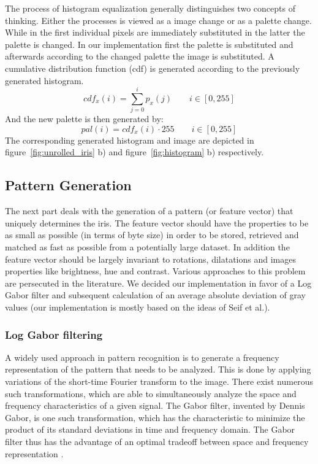 \documentclass[journal]{IEEEtran}
\begin{document}
The process of histogram equalization generally distinguishes two concepts of thinking. Either the processes is viewed as a image change or as a palette change. While in the first individual pixels are immediately substituted in the latter the palette is changed. In our implementation first the palette is substituted and afterwards according to the changed palette the image is substituted.
A cumulative distribution function (cdf) is generated according to the previously generated histogram.
\[
	cdf_x(i) = \sum \limits_{j=0}^{i} p_x(j) \qquad i \in [0, 255]
\]
And the new palette is then generated by:
\[
	pal(i) = cdf_x(i) \cdot 255  \qquad i \in [0, 255]
\]
The corresponding generated histogram and image are depicted in figure~\ref{fig:unrolled_iris} b) and figure~\ref{fig:histogram} b) respectively.
\subsection{Pattern Generation}
The next part deals with the generation of a pattern (or feature vector) that uniquely determines the iris. The feature vector should have the properties to be as small as possible (in terms of byte size) in order to be stored, retrieved and matched as fast as possible from a potentially large dataset. In addition the feature vector should be largely invariant to rotations, dilatations and images properties like brightness, hue and contrast. Various approaches to this problem are persecuted in the literature. We decided our implementation in favor of a Log Gabor filter and subsequent calculation of an average absolute deviation of gray values (our implementation is mostly based on the ideas of Seif et al.\cite{seif2003iris}). 
\subsubsection{Log Gabor filtering}
A widely used approach in pattern recognition is to generate a frequency representation of the pattern that needs to be analyzed. This is done by applying variations of the short-time Fourier transform to the image. There exist numerous such transformations, which are able to simultaneously analyze the space and frequency characteristics of a given signal. The Gabor filter, invented by Dennis Gabor, is one such transformation, which has the characteristic to minimize the product of its standard deviations in time and frequency domain. The Gabor filter thus has the advantage of an optimal tradeoff between space and frequency representation \cite{gabor1946theory}.
\end{document}

